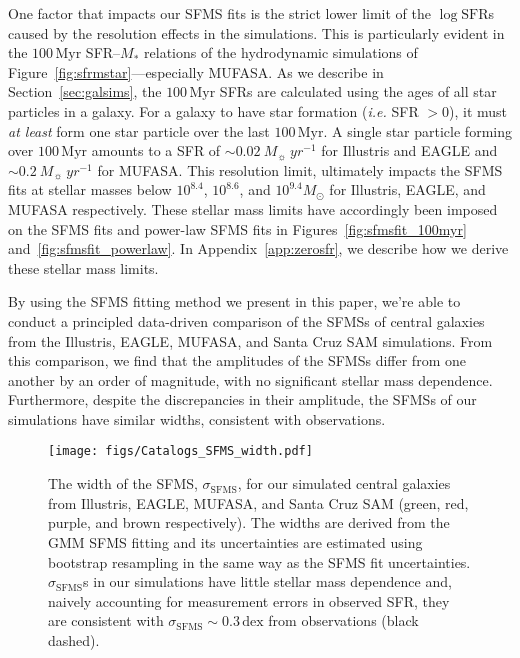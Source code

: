 \documentclass[preprint2,tighten]{aastex62}
\begin{document}
One factor that impacts our SFMS fits is the strict lower limit of the 
$\log\mathrm{SFR}$s caused by the resolution effects in the simulations. 
This is particularly evident in the $100\,\mathrm{Myr}$ SFR--$M_*$ 
relations of the hydrodynamic simulations of Figure~\ref{fig:sfrmstar}---especially 
MUFASA. As we describe in Section~\ref{sec:galsims}, the $100\,\mathrm{Myr}$ 
SFRs are  calculated using the ages of all star particles in a galaxy. For a galaxy to 
have star formation (\emph{i.e.} SFR $> 0$), it must \emph{at least} 
form one star particle over the last $100\,\mathrm{Myr}$. A single star particle 
forming over $100\,\mathrm{Myr}$ amounts to a SFR of 
$\sim 0.02\ M_{\sun}\ yr^{-1}$ for Illustris and EAGLE and
$\sim 0.2\ M_{\sun}\ yr^{-1}$ for MUFASA. This resolution limit, ultimately 
impacts the SFMS fits at stellar masses below $10^{8.4}$, $10^{8.6}$, and 
$10^{9.4}M_\odot$ for Illustris, EAGLE, and MUFASA respectively. 
These stellar mass limits have accordingly been imposed on the SFMS fits
and power-law SFMS fits in Figures~\ref{fig:sfmsfit_100myr} 
and~\ref{fig:sfmsfit_powerlaw}. In Appendix~\ref{app:zerosfr}, we describe
how we derive these stellar mass limits. 

By using the SFMS fitting method we present in this paper, we're able to 
conduct a principled data-driven comparison of the SFMSs of central galaxies 
from the Illustris, EAGLE, MUFASA, and Santa Cruz SAM simulations. From 
this comparison, we find that the amplitudes of the SFMSs differ from one 
another by an order of magnitude, with no significant stellar mass dependence. 
Furthermore, despite the discrepancies in their amplitude, the SFMSs of 
our simulations have similar widths, consistent with observations. 
\begin{figure}
\begin{center}
\texttt{[image: figs/Catalogs\_SFMS\_width.pdf]}
\caption{The width of the SFMS, $\sigma_\mathrm{SFMS}$, for our simulated 
    central galaxies from Illustris, EAGLE, MUFASA, and Santa Cruz SAM 
    (green, red, purple, and brown respectively). The widths are derived from  
    the GMM SFMS fitting and its uncertainties are estimated using bootstrap
    resampling in the same way as the SFMS fit uncertainties. 
    $\sigma_\mathrm{SFMS}$s in our simulations have little stellar mass 
    dependence and, naively accounting for measurement errors in observed 
    SFR, they are consistent with $\sigma_\mathrm{SFMS}{\sim}0.3\,\mathrm{dex}$ 
    from observations (black dashed).} \label{fig:sfms_width}
\end{center}
\end{figure}
\end{document}
